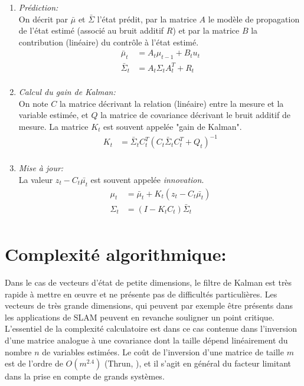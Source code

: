 \begin{enumerate}
	\item{\emph{Prédiction:}\\}
	On décrit par $\bar{\mu}$ et $\bar{\Sigma}$ l'état prédit, par la matrice $A$ le modèle de propagation de l'état estimé (associé au bruit additif $R$) et par la matrice $B$ la contribution (linéaire) du contrôle à l'état estimé.
	\begin{align}
		\bar{\mu}_t    	&= A_t \mu_{t-1} + B_t u_t \label{eq:KF_pred1}\\ 
		\bar{\Sigma}_t 	&= A_t \Sigma_t A_t^T + R_t \label{eq:KF_pred2}\\
	\end{align}
	
	\item{\emph{Calcul du gain de Kalman:}\\}
	On note $C$ la matrice décrivant la relation (linéaire) entre la mesure et la variable estimée, et $Q$ la matrice de covariance décrivant le bruit additif de mesure. La matrice $K_t$ est souvent appelée "gain de Kalman".
	\begin{align}
		K_t			  	&= 	\bar{\Sigma}_t C_t^T \left( C_t \bar{\Sigma}_t  C_t^T  + Q_t\right)^{-1} \label{eq:KF_KG} \\
	\end{align}	
	
	\item{\emph{Mise à jour:}\\}
	La valeur $z_t - C_t \bar{\mu_t}$ est souvent appelée \emph{innovation}.
	\begin{align}
		\mu_t 			&= \bar{\mu}_t + K_t \left(z_t - C_t \bar{\mu_t} \right) 	\label{eq:KF_up1}\\
		\Sigma_t		&= \left( I - K_t C_t \right) \bar{\Sigma}_t 							\label{eq:KF_up2}\\
	\end{align}
\end{enumerate}

\section{Complexité algorithmique:}
Dans le cas de vecteurs d'état de petite dimensions, le filtre de Kalman est très rapide à mettre en œuvre et ne présente pas de difficultés particulières. Les vecteurs de très grande dimensions, qui peuvent par exemple être présents dans les applications de SLAM peuvent en revanche souligner un point critique. L'essentiel de la complexité calculatoire est dans ce cas contenue dans l'inversion d'une matrice analogue à une covariance dont la taille dépend linéairement du nombre $n$ de variables estimées. Le coût de l'inversion d'une matrice de taille $m$ est de l'ordre de $O(m^{2.4})$ (Thrun, \cite{Thrun2005}), et il s'agit en général du facteur limitant dans la prise en compte de grands systèmes. 